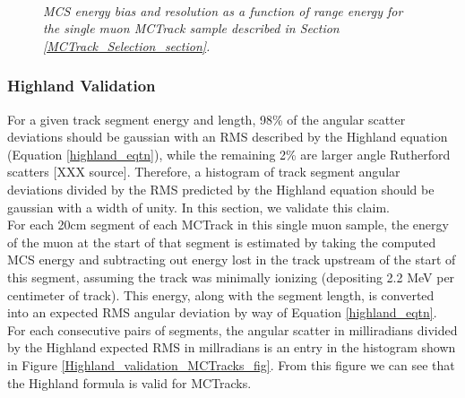 \begin{figure}
\centering
\mbox{
	\quad
	}
\caption{\textit{MCS energy bias and resolution as a function of range energy for the single muon {\sc MCTrack} sample described in Section \ref{MCTrack_Selection_section}.}}
\label{MCS_range_bias_resolution_MCTrack_fig}
\end{figure}



\subsubsection{Highland Validation}\label{Highland_Validation_MCTrack_section}
For a given track segment energy and length, 98\% of the angular scatter deviations should be gaussian with an RMS described by the Highland equation (Equation \ref{highland_eqtn}), while the remaining 2\% are larger angle Rutherford scatters [XXX source]. Therefore, a histogram of track segment angular deviations divided by the RMS predicted by the Highland equation should be gaussian with a width of unity. In this section, we validate this claim.\\

For each 20cm segment of each {\sc MCTrack} in this single muon sample, the energy of the muon at the start of that segment is estimated by taking the computed MCS energy and subtracting out energy lost in the track upstream of the start of this segment, assuming the track was minimally ionizing (depositing 2.2 MeV per centimeter of track). This energy, along with the segment length, is converted into an expected RMS angular deviation by way of Equation \ref{highland_eqtn}. For each consecutive pairs of segments, the angular scatter in milliradians divided by the Highland expected RMS in millradians is an entry in the histogram shown in Figure \ref{Highland_validation_MCTracks_fig}. From this figure we can see that the Highland formula is valid for {\sc MCTracks}.

